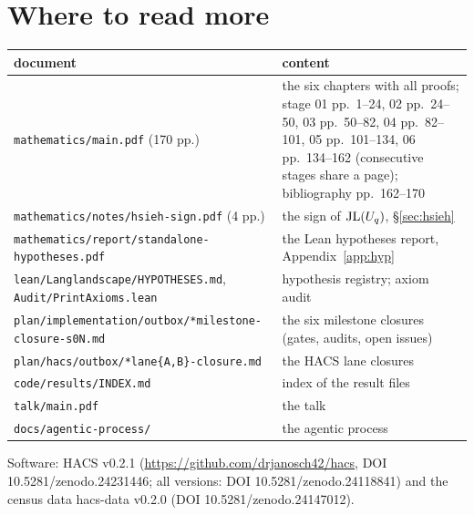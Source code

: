 \section{Where to read more}\label{sec:pointers}
\begin{center}\small
\begin{tabular}{@{}p{}p{}@{}}\toprule
document & content\\\midrule
\texttt{mathematics/main.pdf} (170 pp.) \cite{LLmain} & the six chapters with all proofs; stage 01 pp.~1--24, 02 pp.~24--50,
  03 pp.~50--82, 04 pp.~82--101, 05 pp.~101--134, 06 pp.~134--162 (consecutive stages share a page);
  bibliography pp.~162--170\\
\texttt{mathematics/notes/hsieh-sign.pdf} (4 pp.) \cite{LLhsieh} & the sign of $\mathrm{JL}(U_q)$, \S\ref{sec:hsieh}\\
\texttt{mathematics/report/standalone-hypotheses.pdf} \cite{LLhyp} & the Lean hypotheses report, Appendix~\ref{app:hyp}\\
\texttt{lean/Langlandscape/HYPOTHESES.md}, \texttt{Audit/PrintAxioms.lean} & hypothesis registry; axiom audit\\
\texttt{plan/implementation/outbox/*milestone-closure-s0N.md} & the six milestone closures (gates, audits, open issues)\\
\texttt{plan/hacs/outbox/*lane\{A,B\}-closure.md} & the HACS lane closures\\
\texttt{code/results/INDEX.md} & index of the result files\\
\texttt{talk/main.pdf} & the talk\\
\texttt{docs/agentic-process/} & the agentic process\\\bottomrule
\end{tabular}
\end{center}
Software: HACS v0.2.1 \cite{HACS021} (\url{https://github.com/drjanosch42/hacs}, DOI 10.5281/zenodo.24231446; all versions: DOI 10.5281/zenodo.24118841) and the census
data hacs-data v0.2.0 \cite{HACSdata020} (DOI 10.5281/zenodo.24147012).
